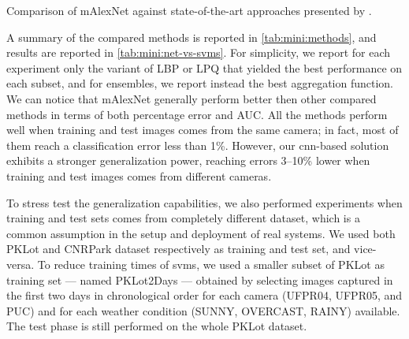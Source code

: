 \begin{table}
	\caption{Comparison of mAlexNet against state-of-the-art approaches presented by \citet{de2015pklot}.}
	\label{tab:mini:net-vs-svms}
\end{table}

A summary of the compared methods is reported in \ref{tab:mini:methods}, and results are reported in \ref{tab:mini:net-vs-svms}.
For simplicity, we report for each experiment only the variant of LBP or LPQ that yielded the best performance on each subset, and for ensembles, we report instead the best aggregation function.
We can notice that mAlexNet generally perform better then other compared methods in terms of both percentage error and AUC.
All the methods perform well when training and test images comes from the same camera;
in fact, most of them reach a classification error less than 1\%.
However, our \gls{cnn}-based solution exhibits a stronger generalization power, reaching errors 3--10\% lower when training and test images comes from different cameras.

To stress test the generalization capabilities, we also performed experiments when training and test sets comes from completely different dataset, which is a common assumption in the setup and deployment of real systems.
We used both PKLot and CNRPark dataset respectively as training and test set, and vice-versa.
To reduce training times of \glspl{svm}, we used a smaller subset of PKLot as training set --- named PKLot2Days --- obtained by selecting images captured in the first two days in chronological order for each camera (UFPR04, UFPR05, and PUC) and for each weather condition (SUNNY, OVERCAST, RAINY) available.
The test phase is still performed on the whole PKLot dataset.

